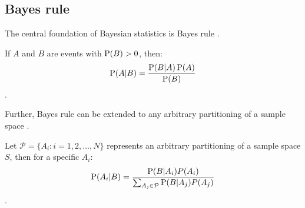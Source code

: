 \label{prelimBayesian}
\begin{DoubleSpace*}
\section{Bayes rule}

The central foundation of Bayesian statistics is Bayes rule \cite{gelman2004}. 
\begin{theorem} If $A$ and $B$ are events with $\operatorname{P}(B)>0$, then:
	\begin{gather}
		\operatorname{P}(A|B) = \frac{\operatorname{P}(B|A)\operatorname{P}(A)}{\operatorname{P}(B)}
	\end{gather}.	
\end{theorem}

Further, Bayes rule can be extended to any arbitrary partitioning of a sample space \cite{casella2002}.
\begin{theorem}
	Let $\mathcal{P}=\{A_i: i=1,2, \hdots, N\}$ represents an arbitrary partitioning of a sample space $S$, then for a specific $A_i$:
	\begin{gather}
			 \operatorname{P}(A_i|B)=\frac{\operatorname{P}(B|A_i)P(A_i)}{\sum_{A_j\in \mathcal{P}}\operatorname{P}(B|A_j)P(A_j)}
	\end{gather}.
\end{theorem}


\end{DoubleSpace*}
